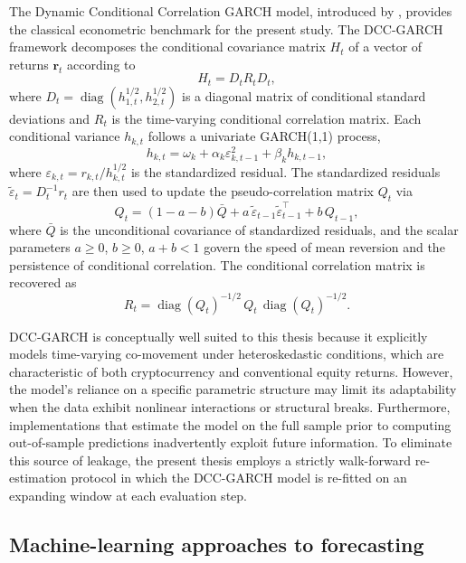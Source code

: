 The Dynamic Conditional Correlation GARCH model, introduced by \textcite{engle2002}, provides the classical econometric benchmark for the present study. The DCC-GARCH framework decomposes the conditional covariance matrix $H_t$ of a vector of returns $\mathbf{r}_t$ according to
\begin{equation}
    H_t = D_t R_t D_t,
\end{equation}
where $D_t = \operatorname{diag}(h_{1,t}^{1/2}, h_{2,t}^{1/2})$ is a diagonal matrix of conditional standard deviations and $R_t$ is the time-varying conditional correlation matrix. Each conditional variance $h_{k,t}$ follows a univariate GARCH(1,1) process,
\begin{equation}
    h_{k,t} = \omega_k + \alpha_k \varepsilon_{k,t-1}^{2} + \beta_k h_{k,t-1},
\end{equation}
where $\varepsilon_{k,t} = r_{k,t}/h_{k,t}^{1/2}$ is the standardized residual. The standardized residuals $\tilde{\varepsilon}_t = D_t^{-1} r_t$ are then used to update the pseudo-correlation matrix $Q_t$ via
\begin{equation}
    Q_t = (1 - a - b)\bar{Q} + a\,\tilde{\varepsilon}_{t-1}\tilde{\varepsilon}_{t-1}^{\top} + b\, Q_{t-1},
\end{equation}
where $\bar{Q}$ is the unconditional covariance of standardized residuals, and the scalar parameters $a \geq 0$, $b \geq 0$, $a + b < 1$ govern the speed of mean reversion and the persistence of conditional correlation. The conditional correlation matrix is recovered as
\begin{equation}
    R_t = \operatorname{diag}(Q_t)^{-1/2}\, Q_t\, \operatorname{diag}(Q_t)^{-1/2}.
\end{equation}

DCC-GARCH is conceptually well suited to this thesis because it explicitly models time-varying co-movement under heteroskedastic conditions, which are characteristic of both cryptocurrency and conventional equity returns. However, the model's reliance on a specific parametric structure may limit its adaptability when the data exhibit nonlinear interactions or structural breaks. Furthermore, implementations that estimate the model on the full sample prior to computing out-of-sample predictions inadvertently exploit future information. To eliminate this source of leakage, the present thesis employs a strictly walk-forward re-estimation protocol in which the DCC-GARCH model is re-fitted on an expanding window at each evaluation step.

\subsection{Machine-learning approaches to forecasting}

